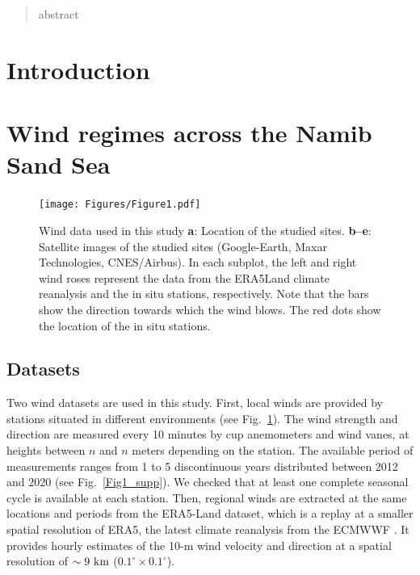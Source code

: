 \begin{abstract}
  abstract
\end{abstract}

\newpage

\section{Introduction}
\section{Wind regimes across the Namib Sand Sea}

  \begin{figure}
    \centering
    \texttt{[image: Figures/Figure1.pdf]}
    \caption{Wind data used in this study \textbf{a}: Location of the studied sites. \textbf{b--e}: Satellite images of the studied sites (Google-Earth, Maxar Technologies, CNES/Airbus). In each subplot, the left and right wind roses represent the data from the ERA5Land climate reanalysis and the in situ stations, respectively. Note that the bars show the direction towards which the wind blows. The red dots show the location of the in situ stations.}
    \label{Fig1}
  \end{figure}

  \subsection{Datasets}

  Two wind datasets are used in this study. First, local winds are provided by stations situated in different environments (see Fig.~\ref{Fig1}). The wind strength and direction are measured every 10 minutes by cup anemometers and wind vanes, at heights between $n$ and $n$ meters depending on the station. The available period of measurements ranges from 1 to 5 discontinuous years distributed between 2012 and 2020 (see Fig.~\ref{Fig1_supp}). We checked that at least one complete seasonal cycle is available at each station.
  Then, regional winds are extracted at the same locations and periods from the ERA5-Land dataset, which is a replay at a smaller spatial resolution of ERA5, the latest climate reanalysis from the ECMWWF \citep{Hersbach2020, munoz2021}. It provides hourly estimates of the 10-m wind velocity and direction at a spatial resolution of $\sim 9~\textup{km}$ ($0.1^\circ\times0.1^\circ$).

